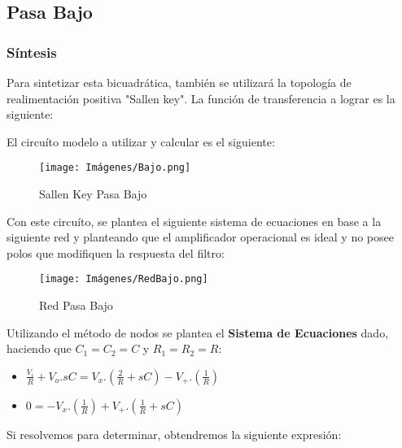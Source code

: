     
    \newpage
    \subsection{Pasa Bajo}
    \subsubsection{Síntesis}
    Para sintetizar esta bicuadrática, también se utilizará la topología de realimentación positiva "Sallen key". La función de transferencia a lograr es la siguiente:\\

    \begin{center}
    \end{center}

    El circuíto modelo a utilizar y calcular es el siguiente:\\

    \begin{figure}[ht]
        \centering
        \texttt{[image: Imágenes/Bajo.png]}
        \caption{Sallen Key Pasa Bajo}
    \end{figure}

    Con este circuíto, se plantea el siguiente sistema de ecuaciones en base a la siguiente red y planteando que el amplificador operacional es ideal y no posee polos que modifiquen la respuesta del filtro:\\

    \begin{figure}[ht]
        \centering
        \texttt{[image: Imágenes/RedBajo.png]}
        \caption{Red Pasa Bajo}
    \end{figure}

    \newpage
    Utilizando el método de nodos se plantea el \textbf{Sistema de Ecuaciones} dado, haciendo que $C_1 = C_2 = C$ y $R_1 = R_2 = R$:\\
    
    \begin{itemize}
        \item $\frac{V_i}{R}+V_o.sC =V_x.(\frac{2}{R}+sC) - V_+.(\frac{1}{R})$
        \item $0 = -V_x.(\frac{1}{R}) + V_+.(\frac{1}{R} + sC)$
    \end{itemize}

    Si resolvemos para determinar, obtendremos la siguiente expresión:\\

